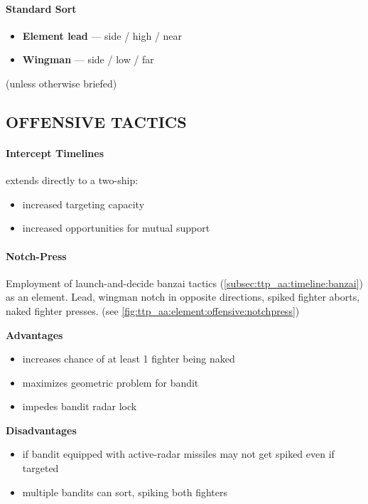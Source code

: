 \paragraph{Standard Sort}
\begin{itemize}
    \item \textbf{Element lead} --- side / high / near
    \item \textbf{Wingman} --- side / low / far
\end{itemize}
\hfill(unless otherwise briefed)

\clearpage

\subsection{OFFENSIVE TACTICS}

\paragraph{Intercept Timelines} 
 extends directly to a two-ship:
\begin{itemize}
    \item increased targeting capacity
    \item increased opportunities for mutual support
\end{itemize}

\paragraph{Notch-Press}
Employment of launch-and-decide banzai tactics (\cref{subsec:ttp_aa:timeline:banzai})
as an element. Lead, wingman notch in opposite directions, 
spiked fighter aborts, 
naked fighter presses.
\hfill(see \cref{fig:ttp_aa:element:offensive:notchpress})

\bigskip
\textbf{Advantages}
\begin{itemize}
    \item increases chance of at least 1 fighter being naked
    \item maximizes geometric problem for bandit
    \item impedes bandit radar lock
\end{itemize}

\textbf{Disadvantages}
\begin{itemize}
    \item if bandit equipped with active-radar missiles may not get spiked even if targeted
    \item multiple bandits can sort, spiking both fighters
\end{itemize}

